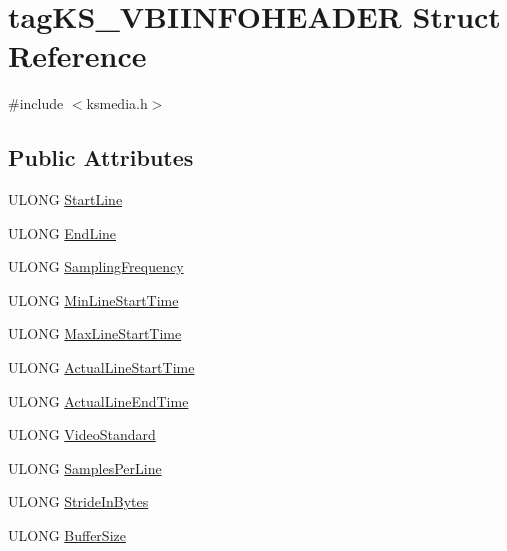 \hypertarget{structtag_k_s___v_b_i_i_n_f_o_h_e_a_d_e_r}{}\section{tag\+K\+S\+\_\+\+V\+B\+I\+I\+N\+F\+O\+H\+E\+A\+D\+ER Struct Reference}
\label{structtag_k_s___v_b_i_i_n_f_o_h_e_a_d_e_r}


{\ttfamily \#include $<$ksmedia.\+h$>$}

\subsection*{Public Attributes}
\begin{DoxyCompactItemize}
\item 
U\+L\+O\+NG \hyperlink{structtag_k_s___v_b_i_i_n_f_o_h_e_a_d_e_r_af944118b4715d3a932fb00f199495b31}{Start\+Line}
\item 
U\+L\+O\+NG \hyperlink{structtag_k_s___v_b_i_i_n_f_o_h_e_a_d_e_r_ac546cc2a670fbb4b6c83ed291c12d9e7}{End\+Line}
\item 
U\+L\+O\+NG \hyperlink{structtag_k_s___v_b_i_i_n_f_o_h_e_a_d_e_r_a8f1ace45447e433f0cce883493558c8e}{Sampling\+Frequency}
\item 
U\+L\+O\+NG \hyperlink{structtag_k_s___v_b_i_i_n_f_o_h_e_a_d_e_r_ad9c99dea90e7f88be48f620cd61365be}{Min\+Line\+Start\+Time}
\item 
U\+L\+O\+NG \hyperlink{structtag_k_s___v_b_i_i_n_f_o_h_e_a_d_e_r_a2391a3ef4b936af918bb84c299f3e3b3}{Max\+Line\+Start\+Time}
\item 
U\+L\+O\+NG \hyperlink{structtag_k_s___v_b_i_i_n_f_o_h_e_a_d_e_r_addceacbfaa333ad99a6b6fd27ecf0f0e}{Actual\+Line\+Start\+Time}
\item 
U\+L\+O\+NG \hyperlink{structtag_k_s___v_b_i_i_n_f_o_h_e_a_d_e_r_acec9198677f2a1324dc3a4663f3fa416}{Actual\+Line\+End\+Time}
\item 
U\+L\+O\+NG \hyperlink{structtag_k_s___v_b_i_i_n_f_o_h_e_a_d_e_r_a08275832c5cc4c4ac64b356bc4629f1e}{Video\+Standard}
\item 
U\+L\+O\+NG \hyperlink{structtag_k_s___v_b_i_i_n_f_o_h_e_a_d_e_r_a0d21941f9eadb8d64d1842ca837a7144}{Samples\+Per\+Line}
\item 
U\+L\+O\+NG \hyperlink{structtag_k_s___v_b_i_i_n_f_o_h_e_a_d_e_r_a12b3e9d6beb8fb299effa817517e3998}{Stride\+In\+Bytes}
\item 
U\+L\+O\+NG \hyperlink{structtag_k_s___v_b_i_i_n_f_o_h_e_a_d_e_r_ae34059e9ef8f312fcef606db0b68c3e9}{Buffer\+Size}
\end{DoxyCompactItemize}


